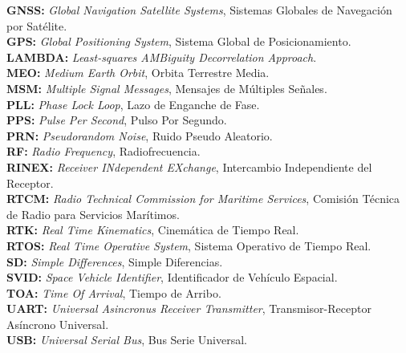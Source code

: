 \documentclass[a4paper,12pt,oneside,onecolumn,final,openright]{book}%
\begin{document}
\textbf{GNSS:} \textit{Global Navigation Satellite Systems}, Sistemas Globales de Navegación por Satélite.\\
\textbf{GPS:} \textit{Global Positioning System}, Sistema Global de Posicionamiento.\\
\textbf{LAMBDA:} \textit{Least-squares AMBiguity Decorrelation Approach}.\\
\textbf{MEO:} \textit{Medium Earth Orbit}, Orbita Terrestre Media.\\
\textbf{MSM:} \textit{Multiple Signal Messages}, Mensajes de Múltiples Señales.\\
\textbf{PLL:} \textit{Phase Lock Loop}, Lazo de Enganche de Fase.\\
\textbf{PPS:} \textit{Pulse Per Second}, Pulso Por Segundo.\\
\textbf{PRN:} \textit{Pseudorandom Noise}, Ruido Pseudo Aleatorio.\\
\textbf{RF:} \textit{Radio Frequency}, Radiofrecuencia.\\
\textbf{RINEX:} \textit{Receiver INdependent EXchange}, Intercambio Independiente del Receptor.\\
\textbf{RTCM:} \textit{Radio Technical Commission for Maritime Services}, Comisión Técnica de Radio para Servicios Marítimos.\\
\textbf{RTK:} \textit{Real Time Kinematics}, Cinemática de Tiempo Real.\\
\textbf{RTOS:} \textit{Real Time Operative System}, Sistema Operativo de Tiempo Real.\\
\textbf{SD:} \textit{Simple Differences}, Simple Diferencias.\\
\textbf{SVID:} \textit{Space Vehicle Identifier}, Identificador de Vehículo Espacial.\\
\textbf{TOA:} \textit{Time Of Arrival}, Tiempo de Arribo.\\
\textbf{UART:} \textit{Universal Asincronus Receiver Transmitter}, Transmisor-Receptor Asíncrono Universal.\\
\textbf{USB:} \textit{Universal Serial Bus}, Bus Serie Universal.\\

\newpage

\listoffigures


\end{document}
